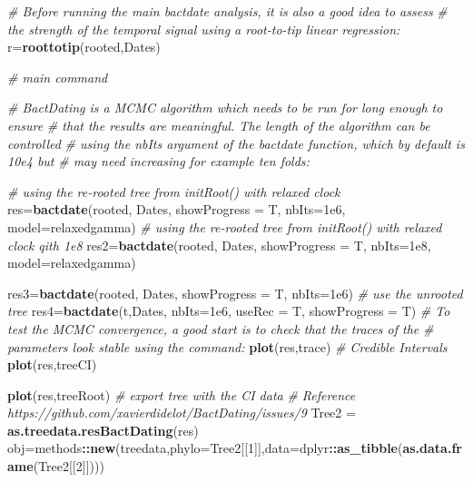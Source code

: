 \documentclass[
]{book}
\newenvironment{Shaded}{\begin{snugshade}}{\end{snugshade}}
\newcommand{\AttributeTok}[1]{\textcolor[rgb]{0.13,0.29,0.53}{#1}}
\newcommand{\CommentTok}[1]{\textcolor[rgb]{0.56,0.35,0.01}{\textit{#1}}}
\newcommand{\DecValTok}[1]{\textcolor[rgb]{0.00,0.00,0.81}{#1}}
\newcommand{\FloatTok}[1]{\textcolor[rgb]{0.00,0.00,0.81}{#1}}
\newcommand{\FunctionTok}[1]{\textcolor[rgb]{0.13,0.29,0.53}{\textbf{#1}}}
\newcommand{\NormalTok}[1]{#1}
\newcommand{\OtherTok}[1]{\textcolor[rgb]{0.56,0.35,0.01}{#1}}
\newcommand{\SpecialCharTok}[1]{\textcolor[rgb]{0.81,0.36,0.00}{\textbf{#1}}}
\newcommand{\StringTok}[1]{\textcolor[rgb]{0.31,0.60,0.02}{#1}}
\begin{document}
\begin{Shaded}
\begin{Highlighting}[]
\CommentTok{\# Before running the main bactdate analysis, it is also a good idea to assess}
\CommentTok{\# the strength of the temporal signal using a root{-}to{-}tip linear regression:}
\NormalTok{r}\OtherTok{=}\FunctionTok{roottotip}\NormalTok{(rooted,Dates)}

\CommentTok{\# main command}

\CommentTok{\# BactDating is a MCMC algorithm which needs to be run for long enough to ensure}
\CommentTok{\# that the results are meaningful. The length of the algorithm can be controlled}
\CommentTok{\# using the nbIts argument of the bactdate function, which by default is 10e4 but}
\CommentTok{\# may need increasing for example ten folds:}

\CommentTok{\# using the re{-}rooted tree from initRoot() with relaxed clock}
\NormalTok{res}\OtherTok{=}\FunctionTok{bactdate}\NormalTok{(rooted, Dates, }\AttributeTok{showProgress =}\NormalTok{ T, }\AttributeTok{nbIts=}\FloatTok{1e6}\NormalTok{, }\AttributeTok{model=}\StringTok{\textquotesingle{}relaxedgamma\textquotesingle{}}\NormalTok{)}
\CommentTok{\# using the re{-}rooted tree from initRoot() with relaxed clock qith 1e8}
\NormalTok{res2}\OtherTok{=}\FunctionTok{bactdate}\NormalTok{(rooted, Dates, }\AttributeTok{showProgress =}\NormalTok{ T, }\AttributeTok{nbIts=}\FloatTok{1e8}\NormalTok{, }\AttributeTok{model=}\StringTok{\textquotesingle{}relaxedgamma\textquotesingle{}}\NormalTok{)}

\NormalTok{res3}\OtherTok{=}\FunctionTok{bactdate}\NormalTok{(rooted, Dates, }\AttributeTok{showProgress =}\NormalTok{ T, }\AttributeTok{nbIts=}\FloatTok{1e6}\NormalTok{)}
\CommentTok{\# use the unrooted tree}
\NormalTok{res4}\OtherTok{=}\FunctionTok{bactdate}\NormalTok{(t,Dates, }\AttributeTok{nbIts=}\FloatTok{1e6}\NormalTok{, }\AttributeTok{useRec =}\NormalTok{ T, }\AttributeTok{showProgress =}\NormalTok{ T)}
\CommentTok{\# To test the MCMC convergence, a good start is to check that the traces of the}
\CommentTok{\# parameters look stable using the command:}
\FunctionTok{plot}\NormalTok{(res,}\StringTok{\textquotesingle{}trace\textquotesingle{}}\NormalTok{)}
\CommentTok{\# Credible Intervals}
\FunctionTok{plot}\NormalTok{(res,}\StringTok{\textquotesingle{}treeCI\textquotesingle{}}\NormalTok{)}

\FunctionTok{plot}\NormalTok{(res,}\StringTok{\textquotesingle{}treeRoot\textquotesingle{}}\NormalTok{)}
\CommentTok{\# export tree with the CI data}
\CommentTok{\# Reference https://github.com/xavierdidelot/BactDating/issues/9}
\NormalTok{Tree2 }\OtherTok{=} \FunctionTok{as.treedata.resBactDating}\NormalTok{(res)}
\NormalTok{obj}\OtherTok{=}\NormalTok{methods}\SpecialCharTok{::}\FunctionTok{new}\NormalTok{(}\StringTok{\textquotesingle{}treedata\textquotesingle{}}\NormalTok{,}\AttributeTok{phylo=}\NormalTok{Tree2[[}\DecValTok{1}\NormalTok{]],}\AttributeTok{data=}\NormalTok{dplyr}\SpecialCharTok{::}\FunctionTok{as\_tibble}\NormalTok{(}\FunctionTok{as.data.frame}\NormalTok{(Tree2[[}\DecValTok{2}\NormalTok{]])))}


\end{Highlighting}
\end{Shaded}
\end{document}
